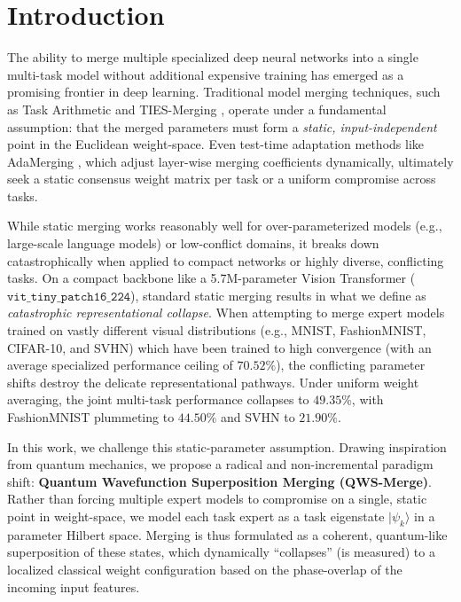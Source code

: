 \section{Introduction}
\label{sec:intro}

The ability to merge multiple specialized deep neural networks into a single multi-task model without additional expensive training has emerged as a promising frontier in deep learning. Traditional model merging techniques, such as Task Arithmetic \cite{ilharco2022editing} and TIES-Merging \cite{yadav2023ties}, operate under a fundamental assumption: that the merged parameters must form a \emph{static, input-independent} point in the Euclidean weight-space. Even test-time adaptation methods like AdaMerging \cite{liang2023adamerging}, which adjust layer-wise merging coefficients dynamically, ultimately seek a static consensus weight matrix per task or a uniform compromise across tasks.

While static merging works reasonably well for over-parameterized models (e.g., large-scale language models) or low-conflict domains, it breaks down catastrophically when applied to compact networks or highly diverse, conflicting tasks. On a compact backbone like a 5.7M-parameter Vision Transformer ($\mathtt{vit\_tiny\_patch16\_224}$), standard static merging results in what we define as \emph{catastrophic representational collapse}. When attempting to merge expert models trained on vastly different visual distributions (e.g., MNIST, FashionMNIST, CIFAR-10, and SVHN) which have been trained to high convergence (with an average specialized performance ceiling of $70.52\%$), the conflicting parameter shifts destroy the delicate representational pathways. Under uniform weight averaging, the joint multi-task performance collapses to $49.35\%$, with FashionMNIST plummeting to $44.50\%$ and SVHN to $21.90\%$.

In this work, we challenge this static-parameter assumption. Drawing inspiration from quantum mechanics, we propose a radical and non-incremental paradigm shift: \textbf{Quantum Wavefunction Superposition Merging (QWS-Merge)}. Rather than forcing multiple expert models to compromise on a single, static point in weight-space, we model each task expert as a task eigenstate $|\psi_k\rangle$ in a parameter Hilbert space. Merging is thus formulated as a coherent, quantum-like superposition of these states, which dynamically ``collapses'' (is measured) to a localized classical weight configuration based on the phase-overlap of the incoming input features.

